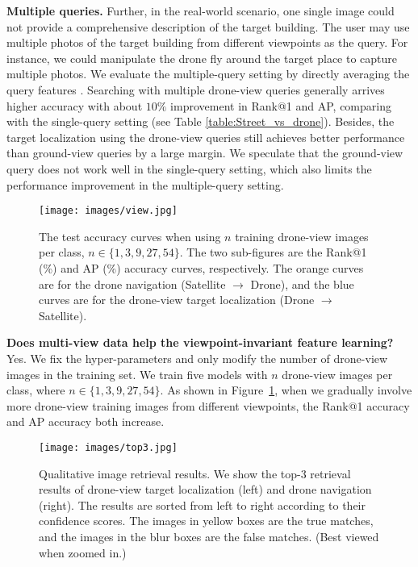 \documentclass[sigconf]{acmart}
\begin{document}
\noindent\textbf{Multiple queries.} Further, in the real-world scenario, one single image could not provide a comprehensive description of the target building. The user may use multiple photos of the target building from different viewpoints as the query. For instance, we could manipulate the drone fly around the target place to capture multiple photos. We evaluate the multiple-query setting by directly averaging the query features \cite{zheng2015scalable}. Searching with multiple drone-view queries generally arrives higher accuracy with about $10\%$ improvement in Rank@1 and AP, comparing with the single-query setting (see Table \ref{table:Street_vs_drone}). Besides, the target localization using the drone-view queries still achieves better performance than ground-view queries by a large margin. We speculate that the ground-view query does not work well in the single-query setting, which also limits the performance improvement in the multiple-query setting. 

\begin{figure}[t]
\begin{center}
     \texttt{[image: images/view.jpg]}
\end{center}
\vspace{-.2in}
      \caption{ The test accuracy curves when using $n$ training drone-view images per class, $n\in\{1, 3, 9, 27, 54\}$. The two sub-figures are the Rank@1 (\%) and AP (\%) accuracy curves, respectively. The orange curves are for the drone navigation  (Satellite $\rightarrow$ Drone), and the blue curves are for the drone-view target localization (Drone $\rightarrow$ Satellite). 
      }\label{fig:views}
\end{figure}

\noindent\textbf{Does multi-view data help the viewpoint-invariant feature learning?} Yes. We fix the hyper-parameters and only modify the number of drone-view images in the training set. We train five models with $n$ drone-view images per class, where $n\in\{1,3,9,27,54\}$. As shown in Figure~\ref{fig:views}, when we gradually involve more drone-view training images from different viewpoints, the Rank@1 accuracy and AP accuracy both increase.  

\begin{figure}[t]
\begin{center}
     \texttt{[image: images/top3.jpg]}
\end{center}
\vspace{-.2in}
      \caption{ Qualitative image retrieval results. We show the top-3 retrieval results of drone-view target localization (left) and drone navigation (right). The results are sorted from left to right according to their confidence scores. The images in yellow boxes are the true matches, and the images in the blur boxes are the false matches. (Best viewed when zoomed in.)
      }\label{fig:visual}
\end{figure}
\end{document}
